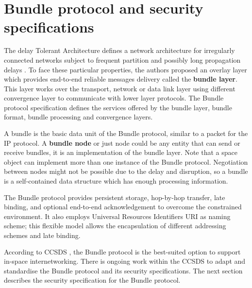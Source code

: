 \section{Bundle protocol and security specifications }
\label{sec:dtn}

The delay Tolerant Architecture defines a network architecture for irregularly connected networks subject to frequent partition and possibly long propagation delays \cite{cerf2007delay}. To face these particular properties, the authors proposed an overlay layer which provides end-to-end reliable messages delivery called the \textbf{bundle layer}. This layer works over the transport, network or data link layer using different convergence layer to communicate with lower layer protocols. The Bundle protocol specification \cite{rfc5050} defines the services offered by the bundle layer, bundle format, bundle processing and convergence layers. 

A bundle is the basic data unit of the Bundle protocol, similar to a packet for the IP protocol. A \textbf{bundle node} or just node could be any entity that can send or receive bundles, it is an implementation of the bundle layer. Note that a space object can implement more than one instance of the Bundle protocol. Negotiation between nodes might not be possible due to the delay and disruption, so a bundle is a self-contained data structure which has enough processing information.


The Bundle protocol provides persistent storage, hop-by-hop transfer, late binding, and optional end-to-end acknowledgement to overcome the constrained environment. It also employs Universal Resources Identifiers URI as naming scheme; this flexible model allows the encapsulation of different addressing schemes and late binding. 

According to CCSDS \cite{rationale2010requirements}, the Bundle protocol is the best-suited option to support in-space internetworking. There is ongoing work within the CCSDS to adapt and standardise the Bundle protocol and its security specifications. The next section describes the security specification for the Bundle protocol. 





 
